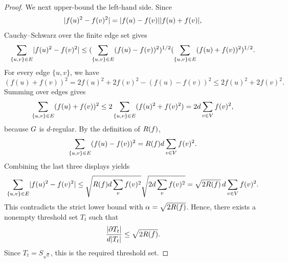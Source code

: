 \begin{proof}
	We next upper-bound the left-hand side. Since
	\begin{equation}
		\lvert f(u)^2-f(v)^2\rvert
		=
		\lvert f(u)-f(v)\rvert\lvert f(u)+f(v)\rvert,
	\end{equation}
	Cauchy--Schwarz over the finite edge set gives
	\begin{equation}
		\sum_{\{u,v\}\in E}\lvert f(u)^2-f(v)^2\rvert
		\leq
		(\sum_{\{u,v\}\in E}(f(u)-f(v))^2)^{1/2}
		(\sum_{\{u,v\}\in E}(f(u)+f(v))^2)^{1/2}.
	\end{equation}
	For every edge \(\{u,v\}\), we have
	\begin{equation}
		(f(u)+f(v))^2
		=
		2f(u)^2+2f(v)^2-(f(u)-f(v))^2
		\leq
		2f(u)^2+2f(v)^2.
	\end{equation}
	Summing over edges gives
	\begin{equation}
		\sum_{\{u,v\}\in E}(f(u)+f(v))^2
		\leq
		2\sum_{\{u,v\}\in E}(f(u)^2+f(v)^2)
		=
		2d\sum_{v\in V}f(v)^2,
	\end{equation}
	because \(G\) is \(d\)-regular. By the definition of \(R(f)\),
	\begin{equation}
		\sum_{\{u,v\}\in E}(f(u)-f(v))^2=R(f)d\sum_{v\in V}f(v)^2.
	\end{equation}
	Combining the last three displays yields
	\begin{equation}
		\sum_{\{u,v\}\in E}\lvert f(u)^2-f(v)^2\rvert
		\leq
		\sqrt{R(f)d\sum_v f(v)^2}\sqrt{2d\sum_v f(v)^2}
		=
		\sqrt{2R(f)}\,d\sum_{v\in V}f(v)^2.
	\end{equation}
	This contradicts the strict lower bound with \(\alpha=\sqrt{2R(f)}\). Hence, there exists a nonempty threshold set \(T_t\) such that
	\begin{equation}
		\frac{\lvert\partial T_t\rvert}{d\lvert T_t\rvert}\leq \sqrt{2R(f)}.
	\end{equation}
	Since \(T_t=S_{\sqrt{t}}\), this is the required threshold set.
\end{proof}

